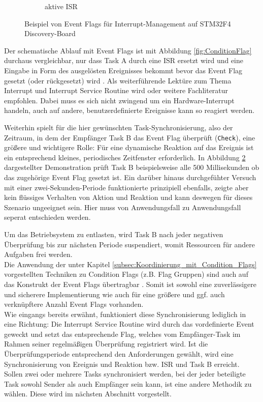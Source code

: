 \documentclass{llncs}
\begin{document}
\begin{figure}
\begin{subfigure}{.250\textwidth}
		\caption{aktive ISR}
		\label{fig:EventFlagAn}
	\end{subfigure}
	\caption{Beispiel von Event Flags für Interrupt-Management auf STM32F4 Discovery-Board}
	\label{fig:EventFlagBeispiel}
\end{figure}

Der schematische Ablauf mit Event Flags ist mit Abbildung \ref{fig:ConditionFlag} durchaus vergleichbar, nur dass Task A durch eine ISR ersetzt wird und eine Eingabe in Form des ausgelösten Ereignisses bekommt bevor das Event Flag gesetzt (oder rückgesetzt) wird \autocite[vgl.][87]{Cooling2017}. Als weiterführende Lektüre zum Thema Interrupt und Interrupt Service Routine wird \autocite{MikrocontrollerInterrupt} oder weitere Fachliteratur empfohlen. Dabei muss es sich nicht zwingend um ein Hardware-Interrupt handeln, auch auf andere, benutzerdefinierte Ereignisse kann so reagiert werden.

Weiterhin spielt für die hier gewünschten Task-Synchronisierung, also der Zeitraum, in dem der Empfänger Task B das Event Flag überprüft (\texttt{Check}), eine größere und wichtigere Rolle: Für eine dynamische Reaktion auf das Ereignis ist ein entsprechend kleines, periodisches Zeitfenster erforderlich. In Abbildung \ref{fig:EventFlagBeispiel} dargestellter Demonstration prüft Task B beispielsweise alle 500 Millisekunden ob das zugehörige Event Flag gesetzt ist. Ein darüber hinaus durchgefühter Versuch mit einer zwei-Sekunden-Periode funktionierte prinzipiell ebenfalls, zeigte aber kein flüssiges Verhalten von Aktion und Reaktion und kann deswegen für dieses Szenario ungeeignet sein. Hier muss von Anwendungsfall zu Anwendungsfall seperat entschieden werden.

Um das Betriebsystem zu entlasten, wird Task B nach jeder negativen Überprüfung bis zur nächsten Periode suspendiert, womit Ressourcen für andere Aufgaben frei werden.\\ 

Die Anwendung der unter Kapitel \ref{subsec:Koordinierung_mit_Condition_Flags} vorgestellten Techniken zu Condition Flags (z.B. Flag Gruppen) sind auch auf das Konstrukt der Event Flags übertragbar \autocite[vgl.][87-88]{Cooling2017}. Somit ist sowohl eine zuverlässigere und sicherere Implementierung wie auch für eine größere und ggf. auch verknüpftere Anzahl Event Flags vorhanden.\\

Wie eingangs bereits erwähnt, funktioniert diese Synchronisierung lediglich in eine Richtung: Die Interrupt Service Routine wird durch das vordefinierte Event geweckt und setzt das entsprechende Flag, welches vom Empfänger-Task im Rahmen seiner regelmäßigen Überprüfung registriert wird. Ist die Überprüfungsperiode entsprechend den Anforderungen gewählt, wird eine Synchronisierung von Ereignis und Reaktion bzw. ISR und Task B erreicht. Sollen zwei oder mehrere Tasks synchronisiert werden, bei der jeder beteiligte Task sowohl Sender als auch Empfänger sein kann, ist eine andere Methodik zu wählen. Diese wird im nächsten Abschnitt vorgestellt.
\end{document}

